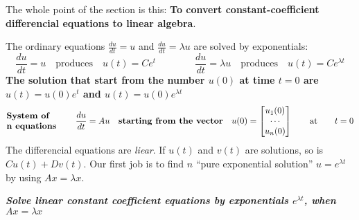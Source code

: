 \documentclass{article}
\begin{document}

The whole point of the section is this: \textbf{To convert constant-coefficient differencial equations to linear algebra}.


The ordinary equations $\frac{du}{dt}=u$ and $\frac{du}{dt}=\lambda u$ are solved by exponentials:
\[ 
  \frac{du}{dt}=u \quad \text{produces} \quad u(t)=Ce^{t}
  \quad \quad \quad \quad
  \frac{du}{dt}=\lambda u \quad \text{produces} \quad u(t)=Ce^{\lambda t}
\]
\textbf{The solution that start from the number $u(0)$ at time $t=0$ are $u(t)=u(0)e^{t}$ and $u(t)=u(0)e^{\lambda t}$}
\[ 
  \parbox{8em}{\textbf{System of \\ n equations}}
  \frac{du}{dt}=Au \quad \text{\textbf{starting from the vector}} \quad
  u(0)=
  \begin{bmatrix}
    u_1(0)\\
    \cdots \\
    u_n(0)
  \end{bmatrix}
  \qquad \text{at} \qquad
  t=0
\]
The differencial equations are \textit{liear}. If $u(t)$ and $v(t)$ are solutions, so is $Cu(t)+Dv(t)$. Our first job is to find $n$ ``pure exponential solution'' $u=e^{\lambda t}$ by using $Ax=\lambda x$.
\begin{center}
  \textit{\textbf{Solve linear constant coefficient equations by exponentials $e^{\lambda t}$, when $Ax=\lambda x$}}
\end{center}
\end{document}
